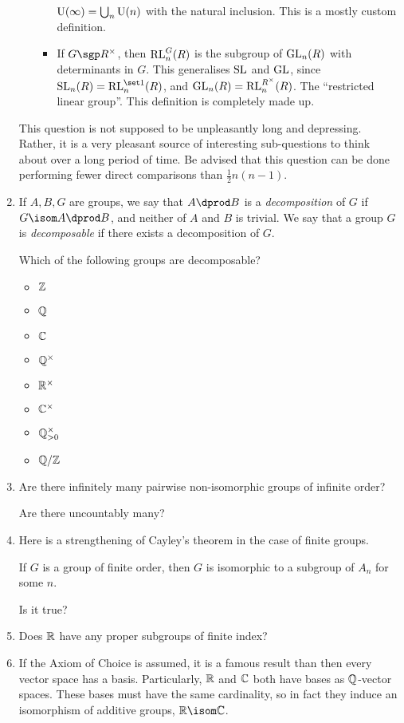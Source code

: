 \documentclass[a4paper,12pt]{article}
\begin{document}
\begin{enumerate}
\begin{itemize}
\begin{itemize}
      \(\mathrm{U}(\infty) = \bigcup_n \mathrm{U}(n)\) with the natural inclusion. This is a
      mostly custom definition.
     \item
      If \(G \sgp R^\times\), then \(\mathrm{RL}_n^G(R)\) is the subgroup of
      \(\mathrm{GL}_n(R)\) with determinants in \(G\). This generalises \(\mathrm{SL}\) and
      \(\mathrm{GL}\), since \(\SL_n(R) = \RL_n^{\set 1}(R)\), and
      \(\mathrm{GL}_n(R) = \mathrm{RL}_n^{R^\times}(R)\).
      The ``restricted linear group''. This definition is completely made up.
    \end{itemize}
  \end{itemize}
  This question is not supposed to be unpleasantly long and depressing.
  Rather, it is a very pleasant source of interesting sub-questions to think
  about over a long period of time.
  Be advised that this question can be done performing
  fewer direct comparisons than \(\tfrac 12 n(n - 1)\).
 \item
  If \(A, B, G\) are groups, we say that \(A \dprod B\) is a
  \emph{decomposition} of \(G\) if \(G \isom A \dprod B\), and neither of \(A\)
  and \(B\) is trivial. We say that a group \(G\) is \emph{decomposable} if
  there exists a decomposition of \(G\).

  Which of the following groups are decomposable?
  \begin{multicols}{4}
   \begin{itemize}
    \item
     \(\mathbb Z\)
    \item
     \(\mathbb Q\)
    \item
     \(\mathbb C\)
    \item
     \(\mathbb Q^\times\)
    \item
     \(\mathbb R^\times\)
    \item
     \(\mathbb C^\times\)
    \item
     \(\mathbb Q_{>0}^\times\)
    \item
     \(\mathbb Q / \mathbb Z\)
   \end{itemize}
  \end{multicols}
 \item
  Are there infinitely many pairwise non-isomorphic groups of infinite order?

  Are there uncountably many?
 \item
  Here is a strengthening of Cayley's theorem in the case of finite groups.
  \begin{tcolorbox}
   If \(G\) is a group of finite order, then \(G\) is isomorphic to a subgroup
   of \(A_n\) for some \(n\).
  \end{tcolorbox}
  Is it true?
 \item
  Does \(\mathbb R\) have any proper subgroups of finite index?
 \item
  If the Axiom of Choice is assumed, it is a famous result than then every
  vector space has a basis. Particularly, \(\mathbb R\) and \(\mathbb C\) both have bases as
  \(\mathbb Q\)-vector spaces. These bases must have the same cardinality, so in fact
  they induce an isomorphism of additive groups, \(\R \isom \C\).


\end{enumerate}
\end{document}
